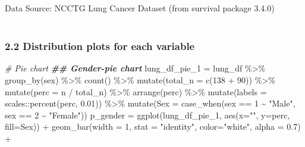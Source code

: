 \documentclass[
]{article}
\newenvironment{Shaded}{\begin{snugshade}}{\end{snugshade}}
\newcommand{\AttributeTok}[1]{\textcolor[rgb]{0.77,0.63,0.00}{#1}}
\newcommand{\CommentTok}[1]{\textcolor[rgb]{0.56,0.35,0.01}{\textit{#1}}}
\newcommand{\DecValTok}[1]{\textcolor[rgb]{0.00,0.00,0.81}{#1}}
\newcommand{\DocumentationTok}[1]{\textcolor[rgb]{0.56,0.35,0.01}{\textbf{\textit{#1}}}}
\newcommand{\FloatTok}[1]{\textcolor[rgb]{0.00,0.00,0.81}{#1}}
\newcommand{\FunctionTok}[1]{\textcolor[rgb]{0.00,0.00,0.00}{#1}}
\newcommand{\NormalTok}[1]{#1}
\newcommand{\OtherTok}[1]{\textcolor[rgb]{0.56,0.35,0.01}{#1}}
\newcommand{\SpecialCharTok}[1]{\textcolor[rgb]{0.00,0.00,0.00}{#1}}
\newcommand{\StringTok}[1]{\textcolor[rgb]{0.31,0.60,0.02}{#1}}
\begin{document}
\begin{minipage}{\linewidth}
Data Source: NCCTG Lung Cancer Dataset (from survival package 3.4.0)\\
\\
\end{minipage}

\hypertarget{distribution-plots-for-each-variable}{%
\subsubsection{2.2 Distribution plots for each
variable}\label{distribution-plots-for-each-variable}}

\begin{Shaded}
\begin{Highlighting}[]
\CommentTok{\# Pie chart}
\DocumentationTok{\#\# Gender{-}pie chart}
\NormalTok{lung\_df\_pie\_1 }\OtherTok{=} 
\NormalTok{  lung\_df }\SpecialCharTok{\%\textgreater{}\%} 
  \FunctionTok{group\_by}\NormalTok{(sex) }\SpecialCharTok{\%\textgreater{}\%} 
  \FunctionTok{count}\NormalTok{() }\SpecialCharTok{\%\textgreater{}\%} 
  \FunctionTok{mutate}\NormalTok{(}\AttributeTok{total\_n =} \FunctionTok{c}\NormalTok{(}\DecValTok{138} \SpecialCharTok{+} \DecValTok{90}\NormalTok{)) }\SpecialCharTok{\%\textgreater{}\%} 
  \FunctionTok{mutate}\NormalTok{(}\AttributeTok{perc =} \StringTok{\textasciigrave{}}\AttributeTok{n}\StringTok{\textasciigrave{}} \SpecialCharTok{/} \StringTok{\textasciigrave{}}\AttributeTok{total\_n}\StringTok{\textasciigrave{}}\NormalTok{) }\SpecialCharTok{\%\textgreater{}\%} 
  \FunctionTok{arrange}\NormalTok{(perc) }\SpecialCharTok{\%\textgreater{}\%}
  \FunctionTok{mutate}\NormalTok{(}\AttributeTok{labels =}\NormalTok{ scales}\SpecialCharTok{::}\FunctionTok{percent}\NormalTok{(perc, }\FloatTok{0.01}\NormalTok{)) }\SpecialCharTok{\%\textgreater{}\%}
  \FunctionTok{mutate}\NormalTok{(}\AttributeTok{Sex =} \FunctionTok{case\_when}\NormalTok{(sex }\SpecialCharTok{==} \DecValTok{1} \SpecialCharTok{\textasciitilde{}} \StringTok{"Male"}\NormalTok{,}
\NormalTok{                         sex }\SpecialCharTok{==} \DecValTok{2} \SpecialCharTok{\textasciitilde{}} \StringTok{"Female"}\NormalTok{)) }
\NormalTok{p\_gender }\OtherTok{=}
  \FunctionTok{ggplot}\NormalTok{(lung\_df\_pie\_1, }\FunctionTok{aes}\NormalTok{(}\AttributeTok{x=}\StringTok{""}\NormalTok{, }\AttributeTok{y=}\NormalTok{perc, }\AttributeTok{fill=}\NormalTok{Sex)) }\SpecialCharTok{+} 
  \FunctionTok{geom\_bar}\NormalTok{(}\AttributeTok{width =} \DecValTok{1}\NormalTok{, }\AttributeTok{stat =} \StringTok{"identity"}\NormalTok{, }\AttributeTok{color=}\StringTok{"white"}\NormalTok{, }\AttributeTok{alpha =} \FloatTok{0.7}\NormalTok{) }\SpecialCharTok{+} 

\end{Highlighting}
\end{Shaded}
\end{document}
